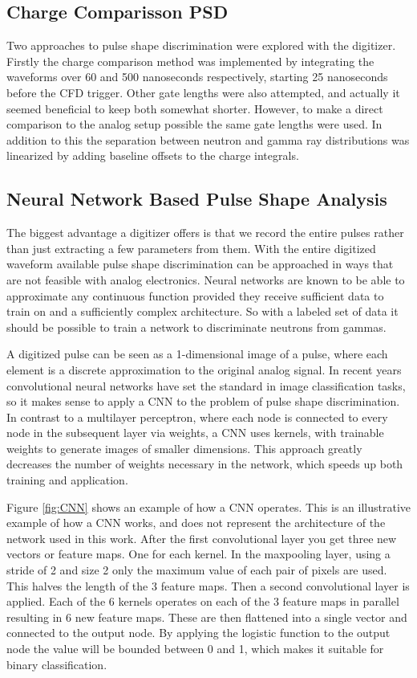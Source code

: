 \documentclass[main.tex]{subfiles}
\begin{document}
\subsection{Charge Comparisson PSD}
Two approaches to pulse shape discrimination were explored with the digitizer. Firstly the charge comparison method was implemented by integrating the waveforms over 60 and 500 nanoseconds respectively, starting 25 nanoseconds before the CFD trigger. Other gate lengths were also attempted, and actually it seemed beneficial to keep both somewhat shorter. However, to make a direct comparison to the analog setup possible the same gate lengths were used. In addition to this the separation between neutron and gamma ray distributions was linearized by adding baseline offsets to the charge integrals.

\subsection{Neural Network Based Pulse Shape Analysis}\label{sec:cnn}
The biggest advantage a digitizer offers is that we record the entire pulses rather than just extracting a few parameters from them. With the entire digitized waveform available pulse shape discrimination can be approached in ways that are not feasible with analog electronics. Neural networks are known to be able to approximate any continuous function provided they receive sufficient data to train on and a sufficiently complex architecture. So with a labeled set of data it should be possible to train a network to discriminate neutrons from gammas. 

A digitized pulse can be seen as a 1-dimensional image of a pulse, where each element is a discrete approximation to the original analog signal. In recent years convolutional neural networks have set the standard in image classification tasks, so it makes sense to apply a CNN to the problem of pulse shape discrimination.  In contrast to a multilayer perceptron, where each node is connected to every node in the subsequent layer via weights, a CNN uses kernels, with trainable weights to generate images of smaller dimensions. This approach greatly decreases the number of weights necessary in the network, which speeds up both training and application\cite[p.330]{Goodfellow-et-al-2016}.

Figure \ref{fig:CNN} shows an example of how a CNN operates. This is an illustrative example of how a CNN works, and does not represent the architecture of the network used in this work. After the first convolutional layer you get three new vectors or feature maps. One for each kernel. In the maxpooling layer, using a stride of 2 and size 2 only the maximum value of each pair of pixels are used. This halves the length of the 3 feature maps. Then a second convolutional layer is applied. Each of the 6 kernels operates on each of the 3 feature maps in parallel resulting in 6 new feature maps. These are then flattened into a single vector and connected to the output node. By applying the logistic function to the output node the value will be bounded between 0 and 1, which makes it suitable for binary classification.
\end{document}
